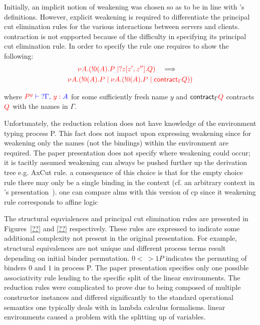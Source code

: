 
Initially, an implicit notion of weakening was chosen so as to be in line with
\citeauthor{Wadler:2014}'s definitions. However, explicit weakening is
required to differentiate the principal cut elimination rules for the various
interactions between servers and clients. contraction is not supported because
of the difficulty in specifying its principal cut elimination rule. In order
to specify the rule one requires to show the following: 
\begin{gather*}
{\color{red}\nu A.(!0(A).P \mid ?z[z',z''].Q)}
\quad \Longrightarrow \quad \\
{\color{red} \nu A.(!0(A).P \mid \nu A.(!0(A).P \mid \textsf{contract}_{\Gamma} Q))}
\end{gather*}

where ${\color{red} P^y} {\color{blue} {} \vdash {}} {\color{blue} {?\Gamma} ,\, {\color{red} y:{}}A}$ for some
sufficiently fresh name $y$ and $\textsf{contract}_{\Gamma} {\color{red} Q}$ contracts
${\color{red} Q}$ with the names in $\Gamma$.

Unfortunately, the reduction relation does not have knowledge of the
environment typing process P. This fact does not impact upon expressing
weakening since for weakening only the names (not the bindings) within the
environment are required. The paper presentation does not specify where
weakening could occur; it is tacitly assumed weakening can always be pushed
further up the derivation tree e.g. AxCut rule. a consequence of this choice
is that for the empty choice rule there may only be a single binding in the
context (cf. an arbitrary context in \citeauthor{Wadler:2014}'s
presentation~\cite{Wadler:2014}). one can compare alms with this version of cp
since it weakening rule corresponds to affine logic




The structural equvialences and principal cut elimination rules are presented
in Figures~\ref{??} and \ref{??} respectively. These rules are expressed to
indicate some additional complexity not present in the original
presentation. For example, structural equivalences are not unique and
different process terms result depending on initial binder permutation. ${0
  <~> 1}P$ indicates the permuting of binders $0$ and $1$ in process P. The
paper presentation specifies only one possible associativity rule lending to
the specific split of the linear environments. The reduction rules were
complicated to prove due to being composed of multiple constructor instances
and differed significantly to the standard operational semantics one typically
deals with in lambda calculus formalisms.  linear environments caused a
problem with the splitting up of variables.

